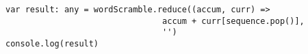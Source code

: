 \documentclass[12pt]{article}
\begin{document}
\begin{enumerate}
\begin{lstlisting}[style=JavaScript]
var result: any = wordScramble.reduce((accum, curr) =>
                                accum + curr[sequence.pop()], 
                                '')
console.log(result)
\end{lstlisting} 


\end{enumerate}
\end{document}
